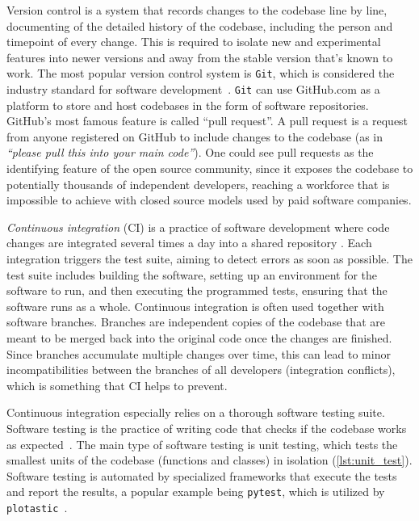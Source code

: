 Version control is a system that records changes to the codebase line by line,
documenting of the detailed history of the codebase, including the person and
timepoint of every change. This is required to isolate new and experimental
features into newer versions and away from the stable version that's known to
work. The most popular version control system is \texttt{Git}, which is
considered the industry standard for software
development~\cite{chaconProGit2014}. \texttt{Git} can use GitHub.com as a
platform to store and host codebases in the form of software repositories.
GitHub's most famous feature is called ``pull request''. A pull request is a
request from anyone registered on GitHub to include changes to the codebase (as
in \textit{``please pull this into your main code''}). One could see pull
requests as the identifying feature of the open source community, since it
exposes the codebase to potentially thousands of independent developers,
reaching a workforce that is impossible to achieve with closed source models
used by paid software companies.

\emph{Continuous integration} (CI) is a practice of software development where
code changes are integrated several times a day into a shared repository
\cite{duvallContinuousIntegrationImproving2007}. Each integration triggers the
test suite, aiming to detect errors as soon as possible. The test suite includes
building the software, setting up an environment for the software to run, and
then executing the programmed tests, ensuring that the software runs as a whole.
Continuous integration is often used together with software branches. Branches
are independent copies of the codebase that are meant to be merged back into the
original code once the changes are finished. Since branches accumulate multiple
changes over time, this can lead to minor incompatibilities between the branches
of all developers (integration conflicts), which is something that CI helps to
prevent.

Continuous integration especially relies on a thorough software testing suite.
Software testing is the practice of writing code that checks if the codebase
works as expected~\cite{10.5555/2161638}. The main type of software testing is
unit testing, which tests the smallest units of the codebase (functions and
classes) in isolation (\autoref{lst:unit_test}). Software testing is automated
by specialized frameworks that execute the tests and report the results, a
popular example being \texttt{pytest}, which is utilized by
\texttt{plotastic}~\cite{pytestx.y}.

